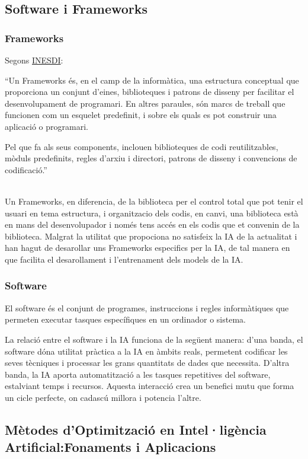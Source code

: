 {\subsection{Software i Frameworks}\label{subsec:Software i Frameworks}

\subsubsection{Frameworks}
Segons \href{https://www.inesdi.com/blog/Frameworks-de-IA-que-debes-conocer/}{INESDI}:\\
{\color{gray}``Un Frameworks és, en el camp de la informàtica, una estructura conceptual que proporciona un conjunt d'eines, biblioteques i patrons de disseny per facilitar el desenvolupament de programari. En altres paraules, són marcs de treball que funcionen com un esquelet predefinit, i sobre els quals es pot construir una aplicació o programari.

Pel que fa als seus components, inclouen biblioteques de codi reutilitzables, mòduls predefinits, regles d'arxiu i directori, patrons de disseny i convencions de codificació.''}\\

Un Frameworks, en diferencia, de la biblioteca per el control total que pot tenir el usuari en tema estructura, i organitzacio dels codis, en canvi, una biblioteca està en mans del desenvolupador i només tens accés en els codis que et convenin de la biblioteca. Malgrat la utilitat que propociona no satisfeix la IA de la actualitat i han hagut de desarollar uns Frameworks especifics per la IA, de tal manera en que facilita el desarollament i l'entrenament dels models de la IA.
\subsubsection{Software}
El software és el conjunt de programes, instruccions i regles informàtiques que permeten executar tasques específiques en un ordinador o sistema.

La relació entre el software i la IA funciona de la següent manera: d'una banda, el software dóna utilitat pràctica a la IA en àmbits reals, permetent codificar les seves tècniques i processar les grans quantitats de dades que necessita. D'altra banda, la IA aporta automatització a les tasques repetitives del software, estalviant temps i recursos. Aquesta interacció crea un benefici mutu que forma un cicle perfecte, on cadascú millora i potencia l'altre.

\subsection{Mètodes d'Optimització en Intel·ligència Artificial:Fonaments i Aplicacions}\label{subsec:Optimització i Ajustos}

}
